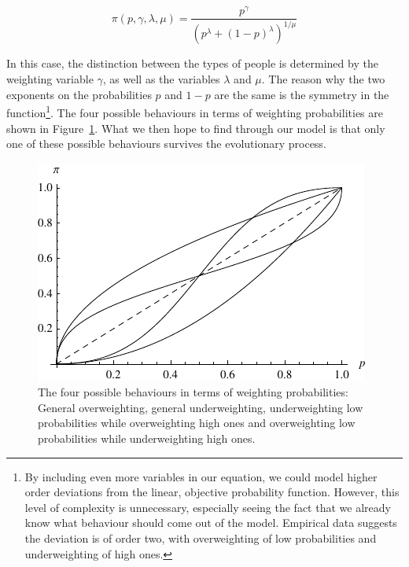 \documentclass[a4paper,10pt]{article}
\numberwithin{equation}{section}
\begin{document}
\begin{equation}
\label{eq:myWeight2}
\pi(p, \gamma, \lambda, \mu)=\frac{p^{\gamma}}{(p^{\lambda}+(1-p)^{\lambda})^{1/\mu}}
\end{equation}

In this case, the distinction between the types of people is determined by the weighting variable $\gamma$, as well as the variables $\lambda$ and $\mu$. The reason why the two exponents on the probabilities $p$ and $1-p$ are the same is the symmetry in the function\footnote{By including even more variables in our equation, we could model higher order deviations from the linear, objective probability function. However, this level of complexity is unnecessary, especially seeing the fact that we already know what behaviour should come out of the model. Empirical data suggests the deviation is of order two, with overweighting of low probabilities and underweighting of high ones.}. The four possible behaviours in terms of weighting probabilities are shown in Figure~\ref{fig:Graph2.pdf}. What we then hope to find through our model is that only one of these possible behaviours survives the evolutionary process.

\begin{figure}[h]
\begin{center}
\leavevmode
\includegraphics[scale=1]{Graph2.pdf}
\captionsetup{width=290pt}
\caption{The four possible behaviours in terms of weighting probabilities: General overweighting, general underweighting, underweighting low probabilities while overweighting high ones and overweighting low probabilities while underweighting high ones.}
\label{fig:Graph2.pdf}
\end{center}
\end{figure}
\end{document}
